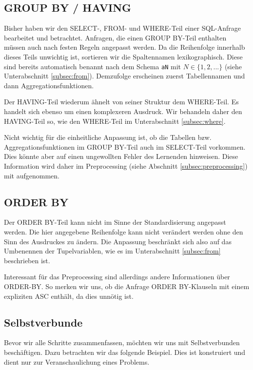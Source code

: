 \subsection{GROUP BY / HAVING}

Bisher haben wir den SELECT-, FROM- und WHERE-Teil einer SQL-Anfrage bearbeitet und betrachtet. Anfragen, die einen GROUP BY-Teil enthalten müssen auch nach festen Regeln angepasst werden. Da die Reihenfolge innerhalb dieses Teils unwichtig ist, sortieren wir die Spaltennamen lexikographisch. Diese sind bereits automatisch benannt nach dem Schema \verb|aN| mit $N\in \{1,2,...\}$ (siehe Unterabschnitt \ref{subsec:from}). Demzufolge erscheinen zuerst Tabellennamen und dann Aggregationsfunktionen.

Der HAVING-Teil wiederum ähnelt von seiner Struktur dem WHERE-Teil. Es handelt sich ebenso um einen komplexeren Ausdruck. Wir behandeln daher den HAVING-Teil so, wie den WHERE-Teil im Unterabschnitt \ref{subsec:where}.

Nicht wichtig für die einheitliche Anpassung ist, ob die Tabellen bzw. Aggregationsfunktionen im GROUP BY-Teil auch im SELECT-Teil vorkommen. Dies könnte aber auf einen ungewollten Fehler des Lernenden hinweisen. Diese Information wird daher im Preprocessing (siehe Abschnitt \ref{subsec:preprocessing}) mit aufgenommen. 

\subsection{ORDER BY}

Der ORDER BY-Teil kann nicht im Sinne der Standardisierung angepasst werden. Die hier angegebene Reihenfolge kann nicht verändert werden ohne den Sinn des Ausdruckes zu ändern. Die Anpassung beschränkt sich also auf das Umbenennen der Tupelvariablen, wie es im Unterabschnitt \ref{subsec:from} beschrieben ist.

Interessant für das Preprocessing sind allerdings andere Informationen über ORDER-BY. So merken wir uns, ob die Anfrage ORDER BY-Klauseln mit einem expliziten ASC enthält, da dies unnötig ist.

\subsection{Selbstverbunde}

Bevor wir alle Schritte zusammenfassen, möchten wir uns mit Selbstverbunden beschäftigen. Dazu betrachten wir das folgende Beispiel. Dies ist konstruiert und dient nur zur Veranschaulichung eines Problems.

